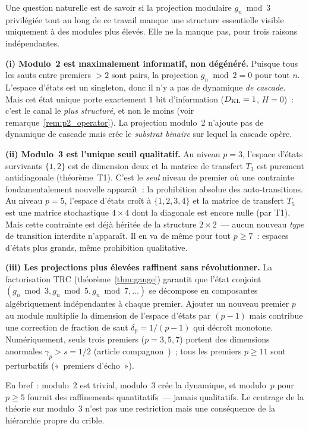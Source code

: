 \documentclass[12pt,a4paper]{article}
\begin{document}
\begin{remarque}
\label{rem:why_mod3}
Une question naturelle est de savoir si la projection modulaire
$g_n \bmod 3$ privilégiée tout au long de ce travail manque une
structure essentielle visible uniquement à des modules plus élevés.
Elle ne la manque pas, pour trois raisons indépendantes.

\textbf{(i) Modulo~2 est maximalement informatif, non dégénéré.}
Puisque tous les sauts entre premiers $> 2$ sont pairs, la projection
$g_n \bmod 2 = 0$ pour tout $n$. L'espace d'états est un singleton,
donc il n'y a pas de dynamique \emph{de cascade}. Mais cet état
unique porte exactement $1$ bit d'information ($D_{\mathrm{KL}} = 1$, $H = 0$)~:
c'est le canal le \emph{plus structuré}, et non le moins
(voir remarque~\ref{rem:p2_operator}).
La projection modulo~2 n'ajoute pas de dynamique de cascade mais crée
le \emph{substrat binaire} sur lequel la cascade opère.

\textbf{(ii) Modulo~3 est l'unique seuil qualitatif.}
Au niveau $p = 3$, l'espace d'états survivants $\{1,2\}$ est de
dimension deux et la matrice de transfert $T_3$ est purement
antidiagonale (théorème~T1). C'est le \emph{seul} niveau de premier
où une contrainte fondamentalement nouvelle apparaît~: la
prohibition absolue des auto-transitions. Au niveau $p = 5$, l'espace
d'états croît à $\{1,2,3,4\}$ et la matrice de transfert $T_5$ est
une matrice stochastique $4 \times 4$ dont la diagonale est encore
nulle (par T1). Mais cette contrainte est déjà héritée de la
structure $2 \times 2$~--- aucun nouveau \emph{type} de transition
interdite n'apparaît. Il en va de même pour tout $p \geq 7$~: espaces
d'états plus grands, même prohibition qualitative.

\textbf{(iii) Les projections plus élevées raffinent sans révolutionner.}
La factorisation TRC (théorème~\ref{thm:gauge}) garantit que l'état
conjoint $(g_n \bmod 3, g_n \bmod 5, g_n \bmod 7, \ldots)$ se
décompose en composantes algébriquement indépendantes à chaque
premier. Ajouter un nouveau premier $p$ au module multiplie la
dimension de l'espace d'états par $(p-1)$ mais contribue une
correction de fraction de saut $\delta_p = 1/(p-1)$ qui décroît
monotone. Numériquement, seuls trois premiers ($p = 3, 5, 7$) portent
des dimensions anormales $\gamma_p > s = 1/2$ (article
compagnon~\cite{companion_M2})~; tous les premiers $p \geq 11$ sont
perturbatifs («~premiers d'écho~»).

En bref~: modulo~2 est trivial, modulo~3 crée la dynamique, et
modulo~$p$ pour $p \geq 5$ fournit des raffinements
quantitatifs~--- jamais qualitatifs. Le centrage de la théorie sur
modulo~3 n'est pas une restriction mais une conséquence de la
hiérarchie propre du crible.
\end{remarque}
\end{document}
